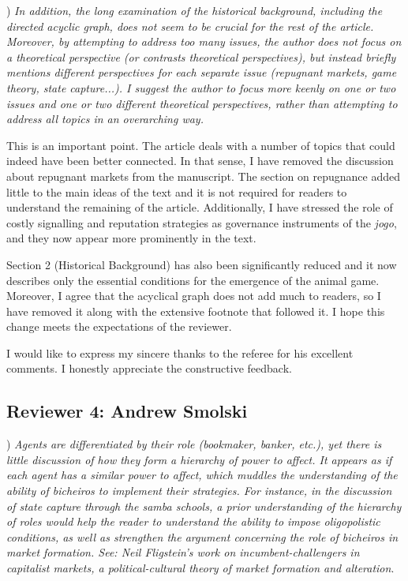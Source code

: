 \documentclass[a4paper,12pt]{article}
\begin{document}
\vspace{.5cm}

) \textit{In addition, the long examination of the historical background, including the directed acyclic graph, does not seem to be crucial for the rest of the article. Moreover, by attempting to address too many issues, the author does not focus on a theoretical perspective (or contrasts theoretical perspectives), but instead briefly mentions different perspectives for each separate issue (repugnant markets, game theory, state capture...). I suggest the author to focus more keenly on one or two issues and one or two different theoretical perspectives, rather than attempting to address all topics in an overarching way.}

\vspace{.25cm}

This is an important point. The article deals with a number of topics that could indeed have been better connected. In that sense, I have removed the discussion about repugnant markets from the manuscript. The section on repugnance added little to the main ideas of the text and it is not required for readers to understand the remaining of the article. Additionally, I have stressed the role of costly signalling and reputation strategies as governance instruments of the \textit{jogo}, and they now appear more prominently in the text.  

Section 2 (Historical Background) has also been significantly reduced and it now describes only the essential conditions for the emergence of the animal game. Moreover, I agree that the acyclical graph does not add much to readers, so I have removed it along with the extensive footnote that followed it. I hope this change meets the expectations of the reviewer.  

\vspace{.5cm}

I would like to express my sincere thanks to the referee for his excellent comments. I honestly appreciate the constructive feedback.

\newpage

\subsection*{Reviewer 4: Andrew Smolski}%
\label{sub:reviewer_4_andrew_smolski}

) \textit{Agents are differentiated by their role (bookmaker, banker, etc.), yet there is little discussion of how they form a hierarchy of power to affect. It appears as if each agent has a similar power to affect, which muddles the understanding of the ability of bicheiros to implement their strategies. For instance, in the discussion of state capture through the samba schools, a prior understanding of the hierarchy of roles would help the reader to understand the ability to impose oligopolistic conditions, as well as strengthen the argument concerning the role of bicheiros in market formation. See: Neil Fligstein's work on incumbent-challengers in capitalist markets, a political-cultural theory of market formation and alteration}. 
\end{document}
